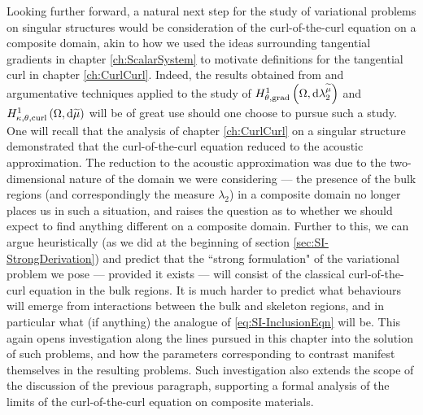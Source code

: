 Looking further forward, a natural next step for the study of variational problems on singular structures would be consideration of the curl-of-the-curl equation on a composite domain, akin to how we used the ideas surrounding tangential gradients in chapter \ref{ch:ScalarSystem} to motivate definitions for the tangential curl in chapter \ref{ch:CurlCurl}.
Indeed, the results obtained from and argumentative techniques applied to the study of $H^1_{\theta, \mathrm{grad}}\left( \Omega, \mathrm{d}\lambda_2^{\widetilde{\mu}} \right)$ and $H^1_{\kappa,\theta,\mathrm{curl}}\left( \Omega, \mathrm{d}\widetilde{\mu} \right)$ will be of great use should one choose to pursue such a study.
One will recall that the analysis of chapter \ref{ch:CurlCurl} on a singular structure demonstrated that the curl-of-the-curl equation reduced to the acoustic approximation.
The reduction to the acoustic approximation was due to the two-dimensional nature of the domain we were considering --- the presence of the bulk regions (and correspondingly the measure $\lambda_2$) in a composite domain no longer places us in such a situation, and raises the question as to whether we should expect to find anything different on a composite domain.
Further to this, we can argue heuristically (as we did at the beginning of section \ref{sec:SI-StrongDerivation}) and predict that the ``strong formulation" of the variational problem we pose --- provided it exists --- will consist of the classical curl-of-the-curl equation in the bulk regions.
It is  much harder to predict what behaviours will emerge from interactions between the bulk and skeleton regions, and in particular what (if anything) the analogue of \eqref{eq:SI-InclusionEqn} will be.
This again opens investigation along the lines pursued in this chapter into the solution of such problems, and how the parameters corresponding to contrast manifest themselves in the resulting problems.
Such investigation also extends the scope of the discussion of the previous paragraph, supporting a formal analysis of the limits of the curl-of-the-curl equation on composite materials.